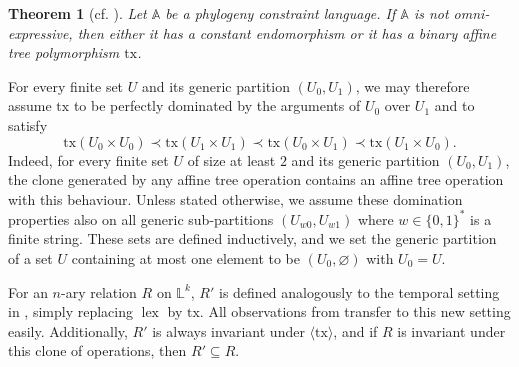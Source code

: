 \documentclass[a4paper,reqno, cleveref]{amsart}
\newcommand{\coloneqq}{\mathrel{\mathop:}\mathrel{\mkern-1.2mu}=}
\newtheorem{theorem}{Theorem}[section]
\newtheorem{definition}[theorem]{Definition}
\newcommand{\Q}{\mathbb{Q}}
\DeclareMathOperator{\lex}{lex}
\newcommand{\sA}{\mathbb A}
\newcommand{\sL}{\mathbb L}
\newcommand{\gen}[1]{\langle#1\rangle}
\newcommand{\genrel}[2]{\langle{#1}\rangle_{#2}}
\newcommand{\tx}{\ensuremath{\mathrm{tx}}\xspace}
\newcommand{\hyp}{\ensuremath{R}\xspace}
\newcommand{\moritz}[1]{\todo{\textbf{Moritz:} #1}}
\begin{document}
\begin{theorem}[cf. \cite{Phylo-Complexity}]\label{phylo:theorem:classification}
   Let $\sA$ be a phylogeny constraint language. If $\sA$ is not omni-expressive, then either it has a constant endomorphism or it has a binary affine tree polymorphism $\tx$.
\end{theorem}
%
For every finite set $U$ and its generic partition $(U_0,U_1)$, we may therefore assume $\tx$ to be perfectly dominated by the arguments of $U_0$ over $U_1$ and to satisfy \begin{equation}\label{phylo:eq:affine_tree}
   \tx(U_0\times U_0)\prec \tx(U_1\times U_1)\prec\tx(U_0\times U_1)\prec\tx(U_1\times U_0). 
\end{equation}
Indeed, for every finite set $U$ of size at least $2$ and its generic partition $(U_0, U_1)$,  the clone generated by any affine tree operation contains an affine tree operation with this behaviour.  
%
Unless stated otherwise, we assume these domination properties also on all generic sub-partitions $(U_{w0},U_{w1})$ where $w\in\{0,1\}^*$ is a finite string. These sets are defined inductively, and we set the generic partition of a set $U$ containing at most one element to be $(U_0,\varnothing)$ with $U_0=U$.

For an $n$-ary relation $\hyp$ on $\sL^k$, $\hyp'$ is defined analogously to the temporal setting in , simply replacing $\lex$ by $\tx$.
%
All observations from  transfer to this new setting easily. Additionally, $\hyp'$ is always invariant under $\gen{\tx}$, and if  $\hyp$ is invariant under this clone of operations, then $\hyp'\subseteq \hyp$.\\

\end{document}
